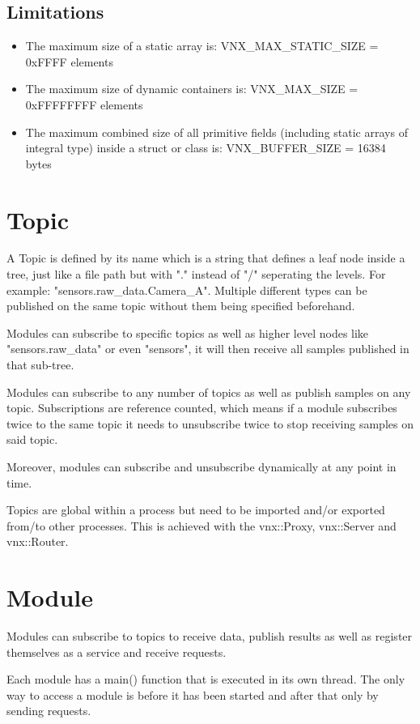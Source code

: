 \documentclass[10pt,a4paper]{report}
\begin{document}
\subsection{Limitations}
\begin{itemize}
\item The maximum size of a static array is: VNX\_MAX\_STATIC\_SIZE = 0xFFFF elements
\item The maximum size of dynamic containers is: VNX\_MAX\_SIZE = 0xFFFFFFFF elements
\item The maximum combined size of all primitive fields (including static arrays of integral type) inside a struct or class is: VNX\_BUFFER\_SIZE = 16384 bytes
\end{itemize}


\section{Topic}

A Topic is defined by its name which is a string that defines a leaf node inside a tree, just like a file path but with "." instead of "/" seperating the levels. For example: "sensors.raw\_data.Camera\_A".
Multiple different types can be published on the same topic without them being specified beforehand.

Modules can subscribe to specific topics as well as higher level nodes like "sensors.raw\_data" or even "sensors", it will then receive all samples published in that sub-tree.

Modules can subscribe to any number of topics as well as publish samples on any topic. Subscriptions are reference counted, which means if a module subscribes twice to the same topic it needs to unsubscribe twice to stop receiving samples on said topic.

Moreover, modules can subscribe and unsubscribe dynamically at any point in time.

Topics are global within a process but need to be imported and/or exported from/to other processes. This is achieved with the vnx::Proxy, vnx::Server and vnx::Router.

\section{Module}

Modules can subscribe to topics to receive data, publish results as well as register themselves as a service and receive requests.

Each module has a main() function that is executed in its own thread. The only way to access a module is before it has been started and after that only by sending requests.
\end{document}
